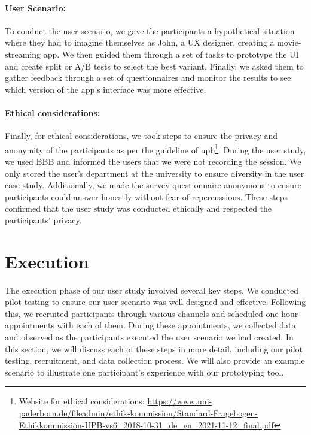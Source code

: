 

\paragraph{User Scenario:}
To conduct the user scenario, we gave the participants a hypothetical situation where they had to imagine themselves as John, a UX designer, creating a movie-streaming app. 
We then guided them through a set of tasks to prototype the UI and create split or A/B tests to select the best variant. 
Finally, we asked them to gather feedback through a set of questionnaires and monitor the results to see which version of the app's interface was more effective.

\paragraph{Ethical considerations:}
Finally, for ethical considerations, we took steps to ensure the privacy and anonymity of the participants as per the guideline of \ac{upb}\footnote{Website for ethical considerations: \url{https://www.uni-paderborn.de/fileadmin/ethik-kommission/Standard-Fragebogen-Ethikkommission-UPB-vs6_2018-10-31_de_en_2021-11-12_final.pdf}}. 
During the user study, we used BBB and informed the users that we were not recording the session. 
We only stored the user's department at the university to ensure diversity in the user case study. Additionally, we made the survey questionnaire anonymous to ensure participants could answer honestly without fear of repercussions. These steps confirmed that the user study was conducted ethically and respected the participants' privacy.

\clearpage
\section{Execution}
\label{evaluation:section:execution}
The execution phase of our user study involved several key steps. 
We conducted pilot testing to ensure our user scenario was well-designed and effective. 
Following this, we recruited participants through various channels and scheduled one-hour appointments with each of them. 
During these appointments, we collected data and observed as the participants executed the user scenario we had created. 
In this section, we will discuss each of these steps in more detail, including our pilot testing, recruitment, and data collection process. 
We will also provide an example scenario to illustrate one participant's experience with our prototyping tool.

